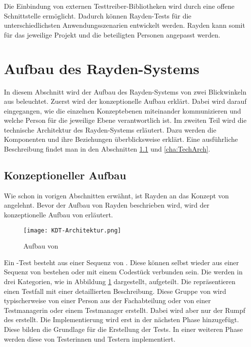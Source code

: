 \SuperPar
Die Einbindung von externen Testtreiber-Bibliotheken wird durch eine offene Schnittstelle ermöglicht. Dadurch können Rayden-Tests für die unterschiedlichsten Anwendungsszenarien entwickelt werden. Rayden kann somit für das jeweilige Projekt und die beteiligten Personen angepasst werden. 


\section{Aufbau des Rayden-Systems}

In diesem Abschnitt wird der Aufbau des Rayden-Systems von zwei Blickwinkeln aus beleuchtet. Zuerst wird der konzeptionelle Aufbau erklärt. Dabei wird darauf eingegangen, wie die einzelnen Konzeptebenen miteinander kommunizieren und welche Person für die jeweilige Ebene verantwortlich ist. Im zweiten Teil wird die technische Architektur des Rayden-Systems erläutert. Dazu werden die Komponenten und ihre Beziehungen überblicksweise erklärt. Eine ausführliche Beschreibung findet man in den Abschnitten \ref{cha:KonzeptAufbau} und \ref{cha:TechArch}.

\subsection{Konzeptioneller Aufbau}
\label{cha:KonzeptAufbau}

Wie schon in vorigen Abschnitten erwähnt, ist Rayden an das Konzept von  angelehnt. Bevor der Aufbau von Rayden beschrieben wird, wird der konzeptionelle Aufbau von  erläutert. 

\begin{figure}[h]
\centering
\texttt{[image: KDT-Architektur.png]}
\caption{Aufbau von }
\label{fig:kdt-arch}
\end{figure}

\SuperPar
Ein -Test besteht aus einer Sequenz von . Diese  können selbst wieder aus einer Sequenz von  bestehen oder mit einem Codestück verbunden sein. Die  werden in drei Kategorien, wie in Abbildung \ref{fig:kdt-arch} dargestellt, aufgeteilt. Die  repräsentieren einen Testfall mit einer detaillierten Beschreibung. Diese Gruppe von  wird typischerweise von einer Person aus der Fachabteilung oder von einer Testmanagerin oder einem Testmanager erstellt. Dabei wird aber nur der Rumpf des  erstellt. Die Implementierung wird erst in der nächsten Phase hinzugefügt. Diese  bilden die Grundlage für die Erstellung der Tests. In einer weiteren Phase werden diese  von Testerinnen und Testern implementiert.

